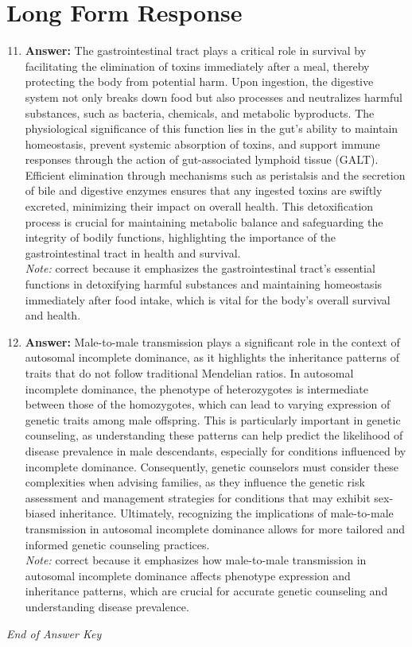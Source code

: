 \documentclass[12pt]{article}
\begin{document}
\section*{Long Form Response}
\begin{enumerate}[label=\arabic*.]
\setcounter{enumi}{10}
\item \textbf{Answer:} The gastrointestinal tract plays a critical role in survival by facilitating the elimination of toxins immediately after a meal, thereby protecting the body from potential harm. Upon ingestion, the digestive system not only breaks down food but also processes and neutralizes harmful substances, such as bacteria, chemicals, and metabolic byproducts. The physiological significance of this function lies in the gut's ability to maintain homeostasis, prevent systemic absorption of toxins, and support immune responses through the action of gut-associated lymphoid tissue (GALT). Efficient elimination through mechanisms such as peristalsis and the secretion of bile and digestive enzymes ensures that any ingested toxins are swiftly excreted, minimizing their impact on overall health. This detoxification process is crucial for maintaining metabolic balance and safeguarding the integrity of bodily functions, highlighting the importance of the gastrointestinal tract in health and survival.
\\ \textit{Note:} correct because it emphasizes the gastrointestinal tract's essential functions in detoxifying harmful substances and maintaining homeostasis immediately after food intake, which is vital for the body's overall survival and health.
\item \textbf{Answer:} Male-to-male transmission plays a significant role in the context of autosomal incomplete dominance, as it highlights the inheritance patterns of traits that do not follow traditional Mendelian ratios. In autosomal incomplete dominance, the phenotype of heterozygotes is intermediate between those of the homozygotes, which can lead to varying expression of genetic traits among male offspring. This is particularly important in genetic counseling, as understanding these patterns can help predict the likelihood of disease prevalence in male descendants, especially for conditions influenced by incomplete dominance. Consequently, genetic counselors must consider these complexities when advising families, as they influence the genetic risk assessment and management strategies for conditions that may exhibit sex-biased inheritance. Ultimately, recognizing the implications of male-to-male transmission in autosomal incomplete dominance allows for more tailored and informed genetic counseling practices.
\\ \textit{Note:} correct because it emphasizes how male-to-male transmission in autosomal incomplete dominance affects phenotype expression and inheritance patterns, which are crucial for accurate genetic counseling and understanding disease prevalence.
\end{enumerate}

\vfill
\noindent\textit{End of Answer Key}
\end{document}
